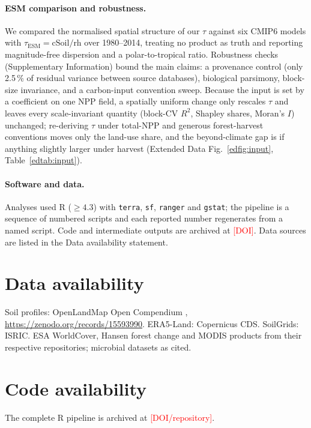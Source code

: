 \documentclass[12pt, a4paper]{article}
\newcommand{\PH}[1]{\textcolor{red}{#1}}
\begin{document}
\paragraph{ESM comparison and robustness.}
We compared the normalised spatial structure of our $\tau$ against six CMIP6 models
\citep{Varney2022} with $\tau_\text{ESM}=\text{cSoil}/\text{rh}$
\citep{Koven2017,Carvalhais2014} over 1980--2014, treating no product as truth and
reporting magnitude-free dispersion and a polar-to-tropical ratio. Robustness checks
(Supplementary Information) bound the main claims: a provenance control (only 2.5\,\%
of residual variance between source databases), biological parsimony, block-size
invariance, and a carbon-input convention sweep. Because the input is set by a
coefficient on one NPP field, a spatially uniform change only rescales $\tau$ and
leaves every scale-invariant quantity (block-CV $R^2$, Shapley shares, Moran's $I$)
unchanged; re-deriving $\tau$ under total-NPP and generous forest-harvest conventions
moves only the land-use share, and the beyond-climate gap is if anything slightly
larger under harvest (Extended Data Fig.~\ref{edfig:input}, Table~\ref{edtab:input}).

\paragraph{Software and data.}
Analyses used R ($\geq4.3$) with \texttt{terra}, \texttt{sf}, \texttt{ranger}
\citep{Wright2017} and \texttt{gstat}; the pipeline is a sequence of numbered
scripts and each reported number regenerates from a named script. Code and
intermediate outputs are archived at \PH{[DOI]}. Data sources are listed in the Data
availability statement.

\section*{Data availability}
Soil profiles: OpenLandMap Open Compendium \citep{OpenLandMapSoilDB2025},
\url{https://zenodo.org/records/15593990}. ERA5-Land: Copernicus CDS. SoilGrids:
ISRIC. ESA WorldCover, Hansen forest change and MODIS products from their respective
repositories; microbial datasets as cited.

\section*{Code availability}
The complete R pipeline is archived at \PH{[DOI/repository]}.
\end{document}
